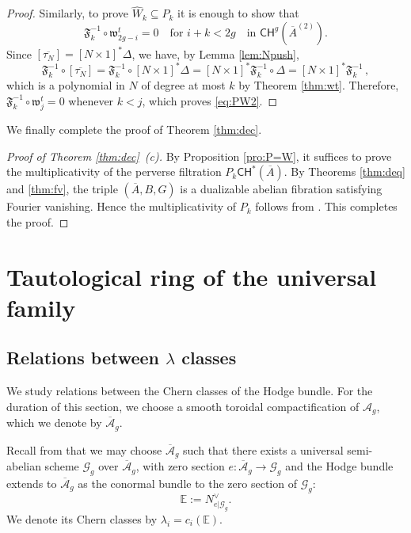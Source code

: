 \documentclass[11pt]{article}
\def\CH{\mathsf{CH}}
\def\fm{\mathfrak{F}}
\newcommand{\barA}{\overline{A}}
\theoremstyle{definition}
\begin{document}
\begin{proof}
    Similarly, to prove $\widehat{W}_k \subseteq P_k$ it is enough to show that
    \begin{equation}\label{eq:PW2}
        \fm^{-1}_k \circ \mathfrak w_{2g-i}^t = 0 \quad \text{for } i+k < 2g \quad \text{in } \CH^g(\barA^{(2)}).
    \end{equation}
    Since $[\overline{\tau_N}] = [N \times 1]^* \Delta$, we have, by Lemma \ref{lem:Npush},
    $$
    \fm^{-1}_k \circ [\overline{\tau_N}] = \fm^{-1}_k \circ [N \times 1]^* \Delta = [N \times 1]^* \fm_k^{-1}\circ \Delta = [N \times 1]^* \fm_k^{-1}\,,
    $$
    which is a polynomial in $N$ of degree at most $k$ by Theorem \ref{thm:wt}. Therefore, $\fm_k^{-1} \circ \mathfrak w_j^t =0$ whenever $k<j$, which proves \eqref{eq:PW2}.
\end{proof}

We finally complete the proof of Theorem \ref{thm:dec}.

\begin{proof}[Proof of Theorem \ref{thm:dec}~(c)]
    By Proposition \ref{pro:P=W}, it suffices to prove the multiplicativity of
    the perverse filtration $P_k \CH^*(\barA)$. By Theorems \ref{thm:deq} and \ref{thm:fv}, the triple $(\barA,B,G)$ is a dualizable abelian fibration satisfying Fourier vanishing. Hence the multiplicativity of $P_k$ follows from \cite[Theorem 2.6]{PerverseFourierMSY25}. This completes the proof.
\end{proof}

\section{Tautological ring of the universal family}\label{sec:taut}

\subsection{Relations between \texorpdfstring{$\lambda$}{lambda} classes}

We study relations between the Chern classes of the Hodge bundle. For the duration of this section, we choose a
smooth toroidal compactification of $\mathcal A_g$, which we denote by $\overline{\mathcal A}_g$.

Recall from \cite{FC} that we may choose $\overline{\mathcal{A}}_g$ such that there exists a universal semi-abelian scheme $\mathcal G_g$ over $\overline{\mathcal A}_g$, with zero section $e: \overline{\mathcal A}_g\to \mathcal G_g$ and the Hodge bundle extends to $\overline{\mathcal{A}}_g$
as the conormal bundle to the zero section of $\mathcal G_g$:
$$\mathbb E := N_{e|\mathcal G_g}^{\vee}.$$
We denote its Chern classes by $\lambda_i = c_i(\mathbb E)$. 
\end{document}
